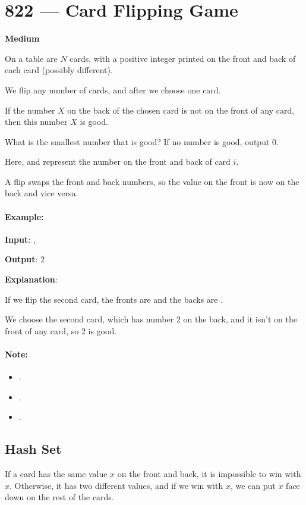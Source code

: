 \section{822 --- Card Flipping Game}

\textbf{Medium}

On a table are $N$ cards, with a positive integer printed on the front and back of each card (possibly different).

We flip any number of cards, and after we choose one card. 

If the number $X$ on the back of the chosen card is not on the front of any card, then this number $X$ is good.

What is the smallest number that is good?  If no number is good, output 0.

Here,  and  represent the number on the front and back of card $i$. 

A flip swaps the front and back numbers, so the value on the front is now on the back and vice versa.

\paragraph{Example:}
\begin{flushleft}

\textbf{Input}: , 

\textbf{Output}: 2

\textbf{Explanation}: 

If we flip the second card, the fronts are \fcj{[1,3,4,4,7]} and the backs are \fcj{[1,2,4,1,3]}.

We choose the second card, which has number 2 on the back, and it isn't on the front of any card, so 2 is good.

\end{flushleft}
 

\paragraph{Note:}

\begin{itemize}
\item {}.
\item {}.
\item {}.
\end{itemize}

\subsection{Hash Set}
If a card has the same value $x$ on the front and back, it is impossible to win with $x$. Otherwise, it has two different values, and if we win with $x$, we can put $x$ face down on the rest of the cards.

\setcounter{lstlisting}{0}

